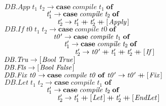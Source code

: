 \documentclass[10pt]{article}
\newcommand{\Conid}[1]{\mathit{#1}}
\newcommand{\Varid}[1]{\mathit{#1}}
\newcommand{\plus}{\mathbin{+\!\!\!+}}
\begin{document}
\begin{hscode}
${\phantom{\Varid{compile}\;\mbox{}}\Conid{\Conid{DB}.App}\;\Varid{t}_{1}\;\Varid{t}_{2}\to \mathbf{case}\;\Varid{compile}\;\Varid{t}_{1}\;\mathbf{of}}$\\
${\phantom{\Varid{compile}\;\mbox{}}\hskip6.00em\relax\Varid{t}_{1}'\to \mathbf{case}\;\Varid{compile}\;\Varid{t}_{2}\;\mathbf{of}}$\\
${\phantom{\Varid{compile}\;\mbox{}}\hskip6.00em\relax\hskip1.50em\relax\Varid{t}_{2}'\to \Varid{t}_{1}'\plus \Varid{t}_{2}'\plus [\mskip1.5mu \Conid{Apply}\mskip1.5mu]}$\\
${\phantom{\Varid{compile}\;\mbox{}}\Conid{\Conid{DB}.If}\;\Varid{t0}\;\Varid{t}_{1}\;\Varid{t}_{2}\to \mathbf{case}\;\Varid{compile}\;\Varid{t0}\;\mathbf{of}}$\\
${\phantom{\Varid{compile}\;\mbox{}}\hskip7.00em\relax\Varid{t0'}\to \mathbf{case}\;\Varid{compile}\;\Varid{t}_{1}\;\mathbf{of}}$\\
${\phantom{\Varid{compile}\;\mbox{}}\hskip7.00em\relax\hskip1.50em\relax\Varid{t}_{1}'\to \mathbf{case}\;\Varid{compile}\;\Varid{t}_{2}\;\mathbf{of}}$\\
${\phantom{\Varid{compile}\;\mbox{}}\hskip7.00em\relax\hskip1.50em\relax\hskip1.50em\relax\Varid{t}_{2}'\to \Varid{t0'}\plus \Varid{t}_{1}'\plus \Varid{t}_{2}'\plus [\mskip1.5mu \Conid{If}\mskip1.5mu]}$\\
${\phantom{\Varid{compile}\;\mbox{}}\Conid{\Conid{DB}.Tru}\to [\mskip1.5mu \Conid{Bool}\;\Conid{True}\mskip1.5mu]}$\\
${\phantom{\Varid{compile}\;\mbox{}}\Conid{\Conid{DB}.Fls}\to [\mskip1.5mu \Conid{Bool}\;\Conid{False}\mskip1.5mu]}$\\
${\phantom{\Varid{compile}\;\mbox{}}\Conid{\Conid{DB}.Fix}\;\Varid{t0}\to \mathbf{case}\;\Varid{compile}\;\Varid{t0}\;\mathbf{of}\;\Varid{t0'}\to \Varid{t0'}\plus [\mskip1.5mu \Conid{Fix}\mskip1.5mu]}$\\
${\phantom{\Varid{compile}\;\mbox{}}\Conid{\Conid{DB}.Let}\;\Varid{t}_{1}\;\Varid{t}_{2}\to \mathbf{case}\;\Varid{compile}\;\Varid{t}_{1}\;\mathbf{of}}$\\
${\phantom{\Varid{compile}\;\mbox{}}\hskip6.00em\relax\Varid{t}_{1}'\to \mathbf{case}\;\Varid{compile}\;\Varid{t}_{2}\;\mathbf{of}}$\\
${\phantom{\Varid{compile}\;\mbox{}}\hskip6.00em\relax\hskip1.50em\relax\Varid{t}_{2}'\to \Varid{t}_{1}'\plus [\mskip1.5mu \Conid{Let}\mskip1.5mu]\plus \Varid{t}_{2}'\plus [\mskip1.5mu \Conid{EndLet}\mskip1.5mu]}$\\
${}$\\

\end{hscode}
\end{document}
